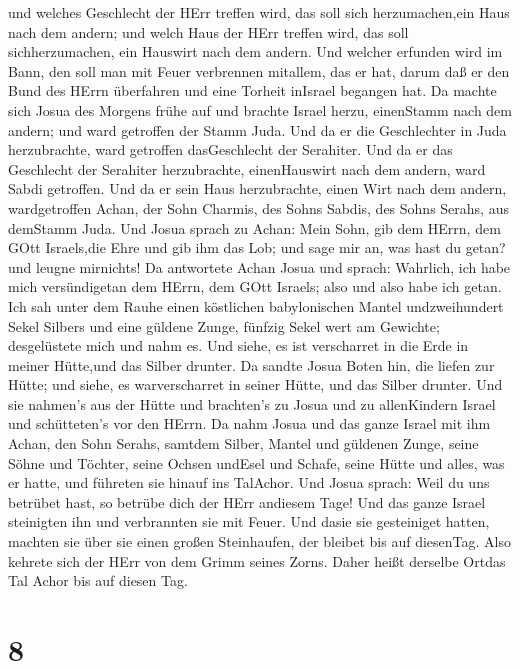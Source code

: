 und welches Geschlecht der HErr treffen wird, das soll sich
herzumachen,ein Haus nach dem andern; und welch Haus der HErr treffen
wird, das soll sichherzumachen, ein Hauswirt nach dem andern.
 Und welcher erfunden wird im Bann, den soll man mit Feuer
verbrennen mitallem, das er hat, darum daß er den Bund des HErrn
überfahren und eine Torheit inIsrael begangen hat.  Da
machte sich Josua des Morgens frühe auf und brachte Israel herzu,
einenStamm nach dem andern; und ward getroffen der Stamm Juda.
 Und da er die Geschlechter in Juda herzubrachte, ward
getroffen dasGeschlecht der Serahiter. Und da er das Geschlecht der
Serahiter herzubrachte, einenHauswirt nach dem andern, ward Sabdi
getroffen.  Und da er sein Haus herzubrachte, einen Wirt
nach dem andern, wardgetroffen Achan, der Sohn Charmis, des Sohns
Sabdis, des Sohns Serahs, aus demStamm Juda.  Und Josua
sprach zu Achan: Mein Sohn, gib dem HErrn, dem GOtt Israels,die Ehre und
gib ihm das Lob; und sage mir an, was hast du getan? und leugne
mirnichts!  Da antwortete Achan Josua und sprach: Wahrlich,
ich habe mich versündigetan dem HErrn, dem GOtt Israels; also und also
habe ich getan.  Ich sah unter dem Rauhe einen köstlichen
babylonischen Mantel undzweihundert Sekel Silbers und eine güldene
Zunge, fünfzig Sekel wert am Gewichte; desgelüstete mich und nahm es.
Und siehe, es ist verscharret in die Erde in meiner Hütte,und das Silber
drunter.  Da sandte Josua Boten hin, die liefen zur Hütte;
und siehe, es warverscharret in seiner Hütte, und das Silber drunter.
 Und sie nahmen's aus der Hütte und brachten's zu Josua und
zu allenKindern Israel und schütteten's vor den HErrn.  Da
nahm Josua und das ganze Israel mit ihm Achan, den Sohn Serahs, samtdem
Silber, Mantel und güldenen Zunge, seine Söhne und Töchter, seine Ochsen
undEsel und Schafe, seine Hütte und alles, was er hatte, und führeten
sie hinauf ins TalAchor.  Und Josua sprach: Weil du uns
betrübet hast, so betrübe dich der HErr andiesem Tage! Und das ganze
Israel steinigten ihn und verbrannten sie mit Feuer. Und dasie sie
gesteiniget hatten,  machten sie über sie einen großen
Steinhaufen, der bleibet bis auf diesenTag. Also kehrete sich der HErr
von dem Grimm seines Zorns. Daher heißt derselbe Ortdas Tal Achor bis
auf diesen Tag.

\hypertarget{section-7}{%
\section{8}\label{section-7}}

